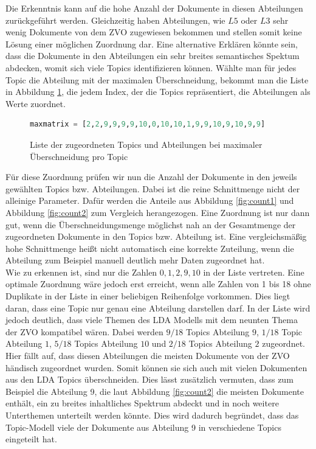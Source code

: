 \documentclass[german,version-2020-11]{uzl-thesis}
\begin{document}
Die Erkenntnis kann auf die hohe Anzahl der Dokumente in diesen Abteilungen zurückgeführt werden. Gleichzeitig haben Abteilungen, wie $L5$ oder $L3$ sehr wenig Dokumente von dem ZVO zugewiesen bekommen und stellen somit keine Lösung einer möglichen Zuordnung dar. Eine alternative Erklären könnte sein, dass die Dokumente in den Abteilungen ein sehr breites semantisches Spektum abdecken, womit sich viele Topics identifizieren können. Wählte man für jedes Topic die Abteilung mit der maximalen Überschneidung, bekommt man die Liste in Abbildung \ref{fig:maxlist}, die jedem Index, der die Topics repräsentiert, die Abteilungen als Werte zuordnet.

\begin{figure}[H]
\begin{center}
\begin{lstlisting}[language=Python]
maxmatrix = [2,2,9,9,9,9,10,0,10,10,1,9,9,10,9,10,9,9]
\end{lstlisting}
\caption{Liste der zugeordneten Topics und Abteilungen bei maximaler Überschneidung pro Topic}
\label{fig:maxlist}
\end{center}
\end{figure}


Für diese Zuordnung prüfen wir nun die Anzahl der Dokumente in den jeweils gewählten Topics bzw. Abteilungen. Dabei ist die reine Schnittmenge nicht der alleinige Parameter. Dafür werden die Anteile aus Abbildung \ref{fig:count1} und Abbildung \ref{fig:count2} zum Vergleich herangezogen. Eine Zuordnung ist nur dann gut, wenn die Überschneidungsmenge möglichst nah an der Gesamtmenge der zugeordneten Dokumente in den Topics bzw. Abteilung ist. Eine vergleichsmäßig hohe Schnittmenge heißt nicht automatisch eine korrekte Zuteilung, wenn die Abteilung zum Beispiel manuell deutlich mehr Daten zugeordnet hat.\\


Wie zu erkennen ist, sind nur die Zahlen $ 0,1,2,9,10 $ in der Liste vertreten. Eine optimale Zuordnung wäre jedoch erst erreicht, wenn alle Zahlen von 1 bis 18 ohne Duplikate in der Liste in einer beliebigen Reihenfolge vorkommen. Dies liegt daran, dass eine Topic nur genau eine Abteilung darstellen darf. In der Liste wird jedoch deutlich, dass viele Themen des LDA Modells mit dem neunten Thema der ZVO kompatibel wären. Dabei werden $9/18$ Topics Abteilung $9$, $1/18$ Topic Abteilung $1$, $5/18$ Topics Abteilung $10$ und $2/18$ Topics Abteilung $2$ zugeordnet. Hier fällt auf, dass diesen Abteilungen die meisten Dokumente von der ZVO händisch zugeordnet wurden. Somit können sie sich auch mit vielen Dokumenten aus den LDA Topics überschneiden. Dies lässt zusätzlich vermuten, dass zum Beispiel die Abteilung 9, die laut Abbildung \ref{fig:count2} die meisten Dokumente enthält, ein zu breites inhaltliches Spektrum abdeckt und in noch weitere Unterthemen unterteilt werden könnte. Dies wird dadurch begründet, dass das Topic-Modell viele der Dokumente aus Abteilung 9 in verschiedene Topics eingeteilt hat.\\
\end{document}
